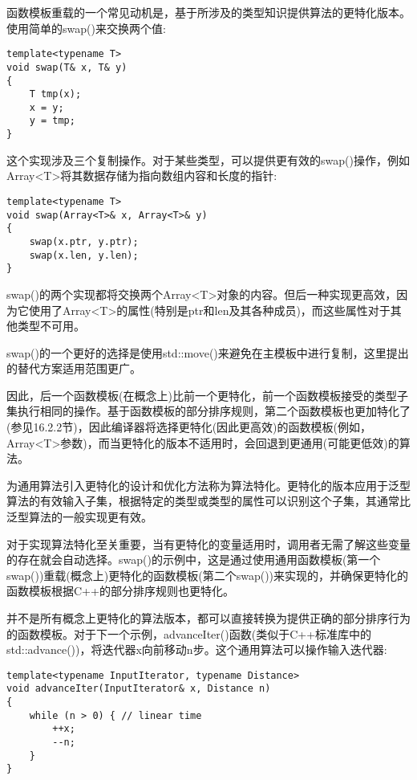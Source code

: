 
函数模板重载的一个常见动机是，基于所涉及的类型知识提供算法的更特化版本。使用简单的swap()来交换两个值:

\begin{lstlisting}[style=styleCXX]
template<typename T>
void swap(T& x, T& y)
{
	T tmp(x);
	x = y;
	y = tmp;
}
\end{lstlisting}

这个实现涉及三个复制操作。对于某些类型，可以提供更有效的swap()操作，例如Array<T>将其数据存储为指向数组内容和长度的指针:

\begin{lstlisting}[style=styleCXX]
template<typename T>
void swap(Array<T>& x, Array<T>& y)
{
	swap(x.ptr, y.ptr);
	swap(x.len, y.len);
}
\end{lstlisting}

swap()的两个实现都将交换两个Array<T>对象的内容。但后一种实现更高效，因为它使用了Array<T>的属性(特别是ptr和len及其各种成员)，而这些属性对于其他类型不可用。

\begin{tcolorbox}[colback=webgreen!5!white,colframe=webgreen!75!black]
\hspace*{0.75cm}swap()的一个更好的选择是使用std::move()来避免在主模板中进行复制，这里提出的替代方案适用范围更广。
\end{tcolorbox}

因此，后一个函数模板(在概念上)比前一个更特化，前一个函数模板接受的类型子集执行相同的操作。基于函数模板的部分排序规则，第二个函数模板也更加特化了(参见16.2.2节)，因此编译器将选择更特化(因此更高效)的函数模板(例如，Array<T>参数)，而当更特化的版本不适用时，会回退到更通用(可能更低效)的算法。

为通用算法引入更特化的设计和优化方法称为算法特化。更特化的版本应用于泛型算法的有效输入子集，根据特定的类型或类型的属性可以识别这个子集，其通常比泛型算法的一般实现更有效。

对于实现算法特化至关重要，当有更特化的变量适用时，调用者无需了解这些变量的存在就会自动选择。swap()的示例中，这是通过使用通用函数模板(第一个swap())重载(概念上)更特化的函数模板(第二个swap())来实现的，并确保更特化的函数模板根据C++的部分排序规则也更特化。

并不是所有概念上更特化的算法版本，都可以直接转换为提供正确的部分排序行为的函数模板。对于下一个示例，advanceIter()函数(类似于C++标准库中的std::advance())，将迭代器x向前移动n步。这个通用算法可以操作输入迭代器:

\begin{lstlisting}[style=styleCXX]
template<typename InputIterator, typename Distance>
void advanceIter(InputIterator& x, Distance n)
{
	while (n > 0) { // linear time
		++x;
		--n;
	}
}
\end{lstlisting}

